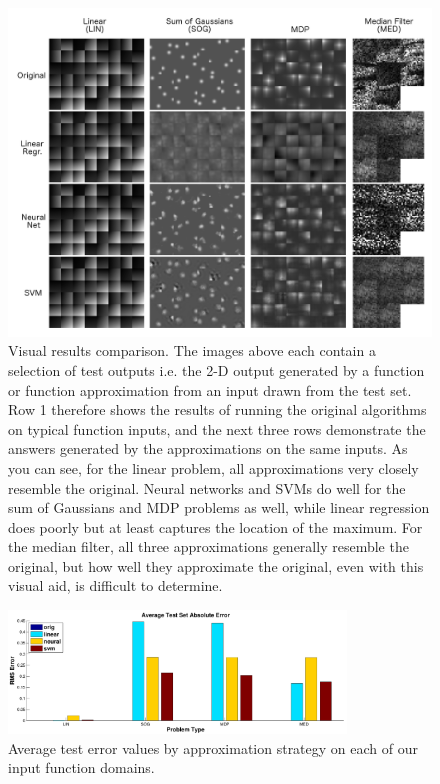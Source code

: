 \documentclass{article}
\begin{document}
\begin{figure}
  \centering
  \includegraphics[width=6.3in]{images/results.png}
  \caption{Visual results comparison. The images above each contain a selection of test outputs i.e. the 2-D output generated by a function or function approximation from an input drawn from the test set. Row 1 therefore shows the results of running the original algorithms on typical function inputs, and the next three rows demonstrate the answers generated by the approximations on the same inputs. As you can see, for the linear problem, all approximations very closely resemble the original. Neural networks and SVMs do well for the sum of Gaussians and MDP problems as well, while linear regression does poorly but at least captures the location of the maximum. For the median filter, all three approximations generally resemble the original, but how well they approximate the original, even with this visual aid, is difficult to determine.}
  \label{fig-pictures}
\end{figure}

\begin{figure}
  \centering
  \includegraphics[width=0.8\textwidth]{images/results_rmse}
  \caption{Average test error values by approximation strategy on each of our input function domains.}
\end{figure}
\end{document}
